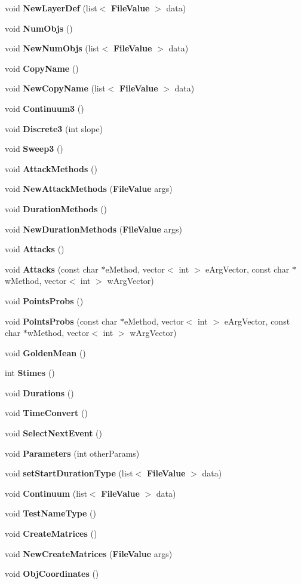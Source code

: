 \begin{CompactItemize}
void {\bf New\-Layer\-Def} (list$<$ {\bf File\-Value} $>$ data)
\item 
void {\bf Num\-Objs} ()
\item 
void {\bf New\-Num\-Objs} (list$<$ {\bf File\-Value} $>$ data)
\item 
void {\bf Copy\-Name} ()
\item 
void {\bf New\-Copy\-Name} (list$<$ {\bf File\-Value} $>$ data)
\item 
void {\bf Continuum3} ()
\item 
void {\bf Discrete3} (int slope)
\item 
void {\bf Sweep3} ()
\item 
void {\bf Attack\-Methods} ()
\item 
void {\bf New\-Attack\-Methods} ({\bf File\-Value} args)
\item 
void {\bf Duration\-Methods} ()
\item 
void {\bf New\-Duration\-Methods} ({\bf File\-Value} args)
\item 
void {\bf Attacks} ()
\item 
void {\bf Attacks} (const  char $\ast$e\-Method, vector$<$ int $>$ e\-Arg\-Vector, const  char $\ast$w\-Method, vector$<$ int $>$ w\-Arg\-Vector)
\item 
void {\bf Points\-Probs} ()
\item 
void {\bf Points\-Probs} (const  char $\ast$e\-Method, vector$<$ int $>$ e\-Arg\-Vector, const  char $\ast$w\-Method, vector$<$ int $>$ w\-Arg\-Vector)
\item 
void {\bf Golden\-Mean} ()
\item 
int {\bf Stimes} ()
\item 
void {\bf Durations} ()
\item 
void {\bf Time\-Convert} ()
\item 
void {\bf Select\-Next\-Event} ()
\item 
void {\bf Parameters} (int other\-Params)
\item 
void {\bf set\-Start\-Duration\-Type} (list$<$ {\bf File\-Value} $>$ data)
\item 
void {\bf Continuum} (list$<$ {\bf File\-Value} $>$ data)
\item 
void {\bf Test\-Name\-Type} ()
\item 
void {\bf Create\-Matrices} ()
\item 
void {\bf New\-Create\-Matrices} ({\bf File\-Value} args)
\item 
void {\bf Obj\-Coordinates} ()
\item 

\end{CompactItemize}

